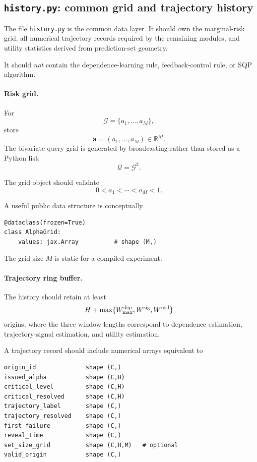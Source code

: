 \documentclass[11pt]{article}
\newcommand{\R}{\mathbb{R}}
\begin{document}
\subsection{\texttt{history.py}: common grid and trajectory history}
\label{app:history-module}

The file \texttt{history.py} is the common data layer.  It should own the
marginal-risk grid, all numerical trajectory records required by the remaining
modules, and utility statistics derived from prediction-set geometry.

It should \emph{not} contain the dependence-learning rule, feedback-control
rule, or SQP algorithm.

\paragraph{Risk grid.}

For
\[
    \mathcal G
    =
    \{a_1,\ldots,a_M\},
\]
store
\[
    \bm a
    =
    (a_1,\ldots,a_M)
    \in\R^M.
\]
The bivariate query grid is generated by broadcasting rather than stored as a
Python list:
\[
    \mathcal Q=\mathcal G^2.
\]

The grid object should validate
\[
    0< a_1 < \cdots < a_M <1.
\]

A useful public data structure is conceptually

\begin{verbatim}
@dataclass(frozen=True)
class AlphaGrid:
    values: jax.Array          # shape (M,)
\end{verbatim}

The grid size $M$ is static for a compiled experiment.

\paragraph{Trajectory ring buffer.}

The history should retain at least
\[
    H+\max\{
        W_{\max}^{\rm dep},
        W^{\rm sig},
        W^{\rm util}
    \}
\]
origins, where the three window lengths correspond to dependence estimation,
trajectory-signal estimation, and utility estimation.

A trajectory record should include numerical arrays equivalent to

\begin{verbatim}
origin_id              shape (C,)
issued_alpha           shape (C,H)
critical_level         shape (C,H)
critical_resolved      shape (C,H)
trajectory_label       shape (C,)
trajectory_resolved    shape (C,)
first_failure          shape (C,)
reveal_time            shape (C,)
set_size_grid          shape (C,H,M)   # optional
valid_origin           shape (C,)
\end{verbatim}
\end{document}
